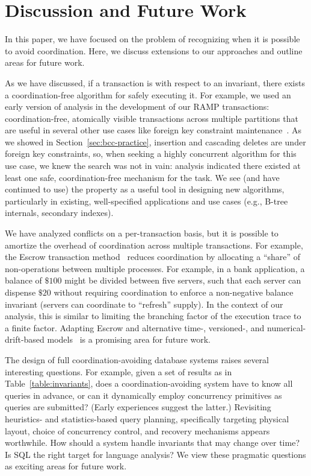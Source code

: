 
\section{Discussion and Future Work}
\label{sec:discussion}
\label{sec:futurework}

In this paper, we have focused on the problem of recognizing when it
is possible to avoid coordination. Here, we discuss extensions to our
approaches and outline areas for future work.

 As we have discussed, if a
transaction is \iconfluent with respect to an invariant, there exists
a coordination-free algorithm for safely executing it.  For example, we
used an early version of \iconfluence analysis in the development of
our RAMP transactions: coordination-free, atomically visible
transactions across multiple partitions that are useful in several
other use cases like foreign key constraint
maintenance~\cite{ramp-txns}. As we showed in
Section~\ref{sec:bcc-practice}, insertion and cascading deletes are
\iconfluent under foreign key constraints, so, when seeking a highly
concurrent algorithm for this use case, we knew the search was not in
vain: \iconfluence analysis indicated there existed at least one safe,
coordination-free mechanism for the task. We see (and have continued
to use) the \iconfluence property as a useful tool in designing new
algorithms, particularly in existing, well-specified applications and
use cases (e.g., B-tree internals, secondary indexes).

 We have analyzed conflicts on a
per-transaction basis, but it is possible to amortize the overhead of
coordination across multiple transactions. For example, the Escrow
transaction method~\cite{escrow} reduces coordination by allocating a
``share'' of non-\iconfluent operations between multiple
processes. For example, in a bank application, a balance of $\$100$
might be divided between five servers, such that each server can
dispense $\$20$ without requiring coordination to enforce a
non-negative balance invariant (servers can coordinate to ``refresh''
supply). In the context of our \cfreedom analysis, this is
similar to limiting the branching factor of the execution trace to a
finite factor. Adapting Escrow and alternative time-, versioned-, and
numerical- drift-based models~\cite{epsilon-divergence} is a promising
area for future work.

 The design of full coordination-avoiding
database systems raises several interesting questions. For example,
given a set of \iconfluence results as in
Table~\ref{table:invariants}, does a coordination-avoiding system have
to know all queries in advance, or can it dynamically employ
concurrency primitives as queries are submitted? (Early experiences
suggest the latter.)  Revisiting heuristics- and statistics-based
query planning, specifically targeting physical layout,
choice of concurrency control, and recovery mechanisms appears
worthwhile. How should a system handle invariants that may change over
time? Is SQL the right target for language analysis? We view these
pragmatic questions as exciting areas for future work.

